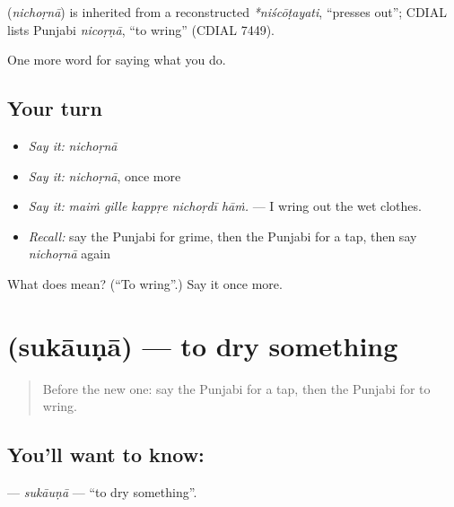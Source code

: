 \begin{cousinweb}
\textbf{} (\emph{nichoṛnā}) is inherited from a reconstructed \emph{*niścōṭayati}, \textquotedblleft{}presses out\textquotedblright{}; CDIAL lists Punjabi \emph{nicoṛṇā}, \textquotedblleft{}to wring\textquotedblright{} (CDIAL 7449).
\end{cousinweb}

\begin{grammarlens}[title={What you've built}]
One more word for saying what you do.
\end{grammarlens}

\subsection*{Your turn}
\begin{itemize}
\raggedright
  \item \emph{Say it:} \emph{nichoṛnā}
  \item \emph{Say it:} \emph{nichoṛnā}, once more
  \item \emph{Say it:} \emph{maiṁ gille kappṛe nichoṛdī hāṁ.} — I wring out the wet clothes.
  \item \emph{Recall:} say the Punjabi for grime, then the Punjabi for a tap, then say \emph{nichoṛnā} again
\end{itemize}

\begin{tcolorbox}[breakable,colback=teal!4,colframe=teal!35!black,title={Before you move on}]
What does  mean? (\textquotedblleft{}To wring\textquotedblright{}.) Say it once more.
\end{tcolorbox}
\section[\texorpdfstring{\pa{ਸੁਕਾਉਣਾ} (sukāuṇā)}{ਸੁਕਾਉਣਾ (sukāuṇā)}]{ (sukāuṇā) — to dry something}

\label{lesson:PA-C228-sukauna}



\begin{quote}
Before the new one: say the Punjabi for a tap, then the Punjabi for to wring.
\end{quote}

\subsection*{You'll want to know: }
\textbf{} — \emph{sukāuṇā} — \textquotedblleft{}to dry something\textquotedblright{}.

